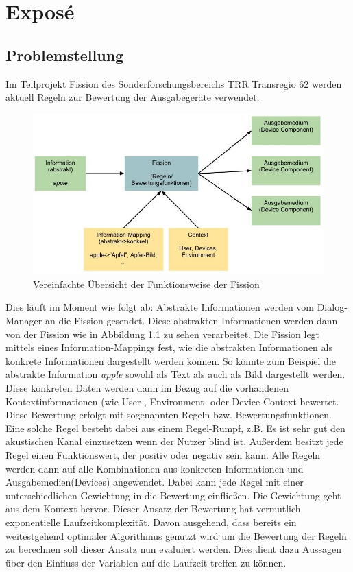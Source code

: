 \setcounter{page}{0}
\chapter{Exposé}

\section{Problemstellung}
Im Teilprojekt Fission des Sonderforschungsbereichs TRR Transregio 62 werden aktuell Regeln zur Bewertung der Ausgabegeräte  verwendet.
\begin{figure}[ht]
    \centering
    \includegraphics[width=.8\textwidth]{images/FissionUebersicht}
    \caption{\label{fission}Vereinfachte Übersicht der Funktionsweise der Fission}
\end{figure}
Dies läuft im Moment wie folgt ab: Abstrakte Informationen werden vom Dialog-Manager an die Fission gesendet. Diese abstrakten Informationen werden dann von der Fission wie in Abbildung \ref{fission} zu sehen verarbeitet. Die Fission legt mittels eines Information-Mappings fest, wie die abstrakten Informationen als konkrete Informationen dargestellt werden können. So könnte zum Beispiel die abstrakte Information \emph{apple} sowohl als Text als auch als Bild dargestellt werden. Diese konkreten Daten werden dann im Bezug auf die vorhandenen Kontextinformationen (wie  User-, Environment- oder Device-Context bewertet.
Diese Bewertung erfolgt mit sogenannten Regeln bzw. Bewertungsfunktionen. Eine solche Regel besteht dabei aus einem Regel-Rumpf, z.B. \glqq Es ist sehr gut den akustischen Kanal einzusetzen wenn der Nutzer blind ist\grqq. Außerdem besitzt jede Regel einen Funktionswert, der positiv oder negativ sein kann. Alle Regeln werden dann auf alle Kombinationen aus konkreten Informationen und Ausgabemedien(Devices) angewendet. Dabei kann jede Regel mit einer unterschiedlichen Gewichtung in die Bewertung einfließen. Die Gewichtung geht aus dem Kontext hervor.
\linebreak
Dieser Ansatz der Bewertung hat vermutlich exponentielle Laufzeitkomplexität. Davon ausgehend, dass bereits ein weitestgehend optimaler Algorithmus genutzt wird um die Bewertung der Regeln zu berechnen soll dieser Ansatz nun evaluiert werden. Dies dient dazu Aussagen über den Einfluss der Variablen auf die Laufzeit treffen zu können. 


